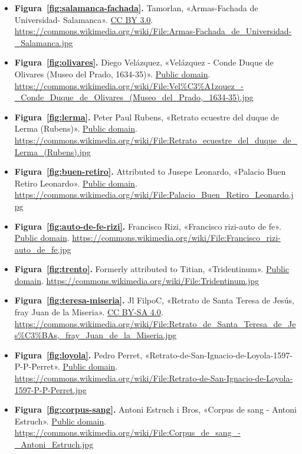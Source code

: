 \documentclass{book}
\begin{document}
\begin{itemize}
\item \textbf{Figura~\ref{fig:salamanca-fachada}.} Tamorlan, «Armas-Fachada de Universidad- Salamanca». \href{https://creativecommons.org/licenses/by/3.0/}{CC BY 3.0}. \url{https://commons.wikimedia.org/wiki/File:Armas-Fachada_de_Universidad-_Salamanca.jpg}
\item \textbf{Figura~\ref{fig:olivares}.} Diego Velázquez, «Velázquez - Conde Duque de Olivares (Museo del Prado, 1634-35)». \href{https://creativecommons.org/publicdomain/mark/1.0/}{Public domain}. \url{https://commons.wikimedia.org/wiki/File:Vel%C3%A1zquez_-_Conde_Duque_de_Olivares_(Museo_del_Prado,_1634-35).jpg}
\item \textbf{Figura~\ref{fig:lerma}.} Peter Paul Rubens, «Retrato ecuestre del duque de Lerma (Rubens)». \href{https://creativecommons.org/publicdomain/mark/1.0/}{Public domain}. \url{https://commons.wikimedia.org/wiki/File:Retrato_ecuestre_del_duque_de_Lerma_(Rubens).jpg}
\item \textbf{Figura~\ref{fig:buen-retiro}.} Attributed to Jusepe Leonardo, «Palacio Buen Retiro Leonardo». \href{https://creativecommons.org/publicdomain/mark/1.0/}{Public domain}. \url{https://commons.wikimedia.org/wiki/File:Palacio_Buen_Retiro_Leonardo.jpg}
\item \textbf{Figura~\ref{fig:auto-de-fe-rizi}.} Francisco Rizi, «Francisco rizi-auto de fe». \href{https://creativecommons.org/publicdomain/mark/1.0/}{Public domain}. \url{https://commons.wikimedia.org/wiki/File:Francisco_rizi-auto_de_fe.jpg}
\item \textbf{Figura~\ref{fig:trento}.} Formerly attributed to Titian, «Tridentinum». \href{https://creativecommons.org/publicdomain/mark/1.0/}{Public domain}. \url{https://commons.wikimedia.org/wiki/File:Tridentinum.jpg}
\item \textbf{Figura~\ref{fig:teresa-miseria}.} Jl FilpoC, «Retrato de Santa Teresa de Jesús, fray Juan de la Miseria». \href{https://creativecommons.org/licenses/by-sa/4.0/}{CC BY-SA 4.0}. \url{https://commons.wikimedia.org/wiki/File:Retrato_de_Santa_Teresa_de_Jes%C3%BAs,_fray_Juan_de_la_Miseria.jpg}
\item \textbf{Figura~\ref{fig:loyola}.} Pedro Perret, «Retrato-de-San-Ignacio-de-Loyola-1597-P-P-Perret». \href{https://creativecommons.org/publicdomain/mark/1.0/}{Public domain}. \url{https://commons.wikimedia.org/wiki/File:Retrato-de-San-Ignacio-de-Loyola-1597-P-P-Perret.jpg}
\item \textbf{Figura~\ref{fig:corpus-sang}.} Antoni Estruch i Bros, «Corpus de sang - Antoni Estruch». \href{https://creativecommons.org/publicdomain/mark/1.0/}{Public domain}. \url{https://commons.wikimedia.org/wiki/File:Corpus_de_sang_-_Antoni_Estruch.jpg}

\end{itemize}
\end{document}
